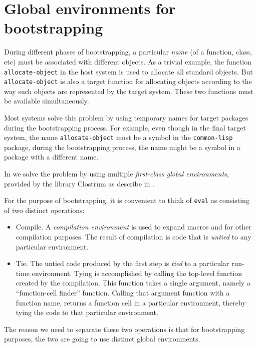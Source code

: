 \section{Global environments for bootstrapping}

During different phases of bootstrapping, a particular \emph{name} (of
a function, class, etc) must be associated with different objects.  As
a trivial example, the function \texttt{allocate-object} in the host
system is used to allocate all standard objects.  But
\texttt{allocate-object} is also a target function for allocating
objects according to the way such objects are represented by the
target system.  These two functions must be available simultaneously.

Most systems solve this problem by using temporary names for target
packages during the bootstrapping process.  For example, even though
in the final target system, the name \texttt{allocate-object} must be
a symbol in the \texttt{common-lisp} package, during the bootstrapping
process, the name might be a symbol in a package with a different
name.

In \sysname{} we solve the problem by using multiple \emph{first-class
  global environments}, provided by the library Clostrum as describe
in .

For the purpose of bootstrapping, it is convenient to think of
\texttt{eval} as consisting of two distinct operations:

\begin{itemize}
\item Compile.  A \emph{compilation environment} is used to expand
  macros and for other compilation purposes.  The result of
  compilation is code that is \emph{untied} to any particular
  environment.
\item Tie.  The untied code produced by the first step is \emph{tied}
  to a particular run-time environment.  Tying is accomplished by
  calling the top-level function created by the compilation.  This
  function takes a single argument, namely a ``function-cell finder''
  function.  Calling that argument function with a function name,
  returns a function cell in a particular environment, thereby tying
  the code to that particular environment.
\end{itemize}

The reason we need to separate these two operations is that for
bootstrapping purposes, the two are going to use distinct global
environments.


